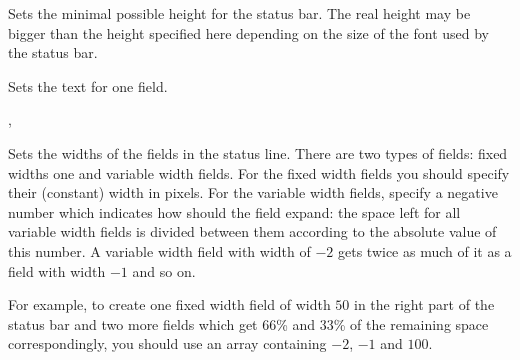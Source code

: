 

\label{wxstatusbarsetminheight}


Sets the minimal possible height for the status bar. The real height may be
bigger than the height specified here depending on the size of the font used by
the status bar.

\label{wxstatusbarsetstatustext}


Sets the text for one field.





, 

\label{wxstatusbarsetstatuswidths}


Sets the widths of the fields in the status line. There are two types of
fields: fixed widths one and variable width fields. For the fixed width fields
you should specify their (constant) width in pixels. For the variable width
fields, specify a negative number which indicates how should the field expand:
the space left for all variable width fields is divided between them according
to the absolute value of this number. A variable width field with width of $-2$
gets twice as much of it as a field with width $-1$ and so on.

For example, to create one fixed width field of width $50$ in the right part of
the status bar and two more fields which get $66$\% and $33$\% of the remaining
space correspondingly, you should use an array containing $-2$, $-1$ and $100$.


